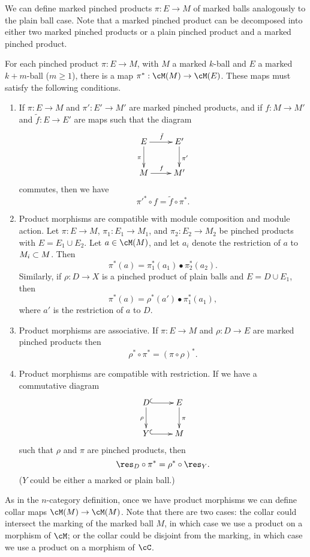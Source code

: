 \medskip

We can define marked pinched products $\pi:E\to M$ of marked balls analogously to the 
plain ball case.
Note that a marked pinched product can be decomposed into either
two marked pinched products or a plain pinched product and a marked pinched product.

\begin{module-axiom}
For each pinched product $\pi:E\to M$, with $M$ a marked $k$-ball and $E$ a marked
$k{+}m$-ball ($m\ge 1$),
there is a map $\pi^*:\cM(M)\to \cM(E)$.
These maps must satisfy the following conditions.
\begin{enumerate}
\item
If $\pi:E\to M$ and $\pi':E'\to M'$ are marked pinched products, and
if $f:M\to M'$ and $\tilde{f}:E \to E'$ are maps such that the diagram
\[ \xymatrix{
	E \ar[r]^{\tilde{f}} \ar[d]_{\pi} & E' \ar[d]^{\pi'} \\
	M \ar[r]^{f} & M'
} \]
commutes, then we have 
\[
	\pi'^*\circ f = \tilde{f}\circ \pi^*.
\]
\item
Product morphisms are compatible with module composition and module action.
Let $\pi:E\to M$, $\pi_1:E_1\to M_1$, and $\pi_2:E_2\to M_2$ 
be pinched products with $E = E_1\cup E_2$.
Let $a\in \cM(M)$, and let $a_i$ denote the restriction of $a$ to $M_i\subset M$.
Then 
\[
	\pi^*(a) = \pi_1^*(a_1)\bullet \pi_2^*(a_2) .
\]
Similarly, if $\rho:D\to X$ is a pinched product of plain balls and
$E = D\cup E_1$, then
\[
	\pi^*(a) = \rho^*(a')\bullet \pi_1^*(a_1),
\]
where $a'$ is the restriction of $a$ to $D$.
\item
Product morphisms are associative.
If $\pi:E\to M$ and $\rho:D\to E$ are marked pinched products then
\[
	\rho^*\circ\pi^* = (\pi\circ\rho)^* .
\]
\item
Product morphisms are compatible with restriction.
If we have a commutative diagram
\[ \xymatrix{
	D \ar@{^(->}[r] \ar[d]_{\rho} & E \ar[d]^{\pi} \\
	Y \ar@{^(->}[r] & M
} \]
such that $\rho$ and $\pi$ are pinched products, then
\[
	\res_D\circ\pi^* = \rho^*\circ\res_Y .
\]
($Y$ could be either a marked or plain ball.)
\end{enumerate}
\end{module-axiom}

As in the $n$-category definition, once we have product morphisms we can define
collar maps $\cM(M)\to \cM(M)$.
Note that there are two cases:
the collar could intersect the marking of the marked ball $M$, in which case
we use a product on a morphism of $\cM$; or the collar could be disjoint from the marking,
in which case we use a product on a morphism of $\cC$.

